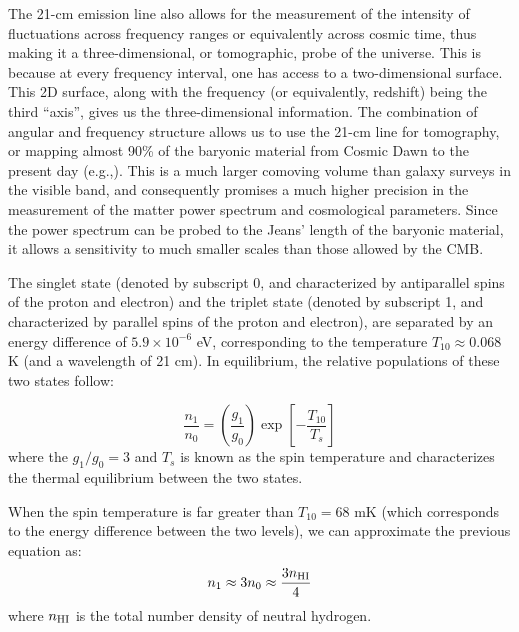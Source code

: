  The 21-cm emission line also allows for the measurement of the intensity of fluctuations across frequency ranges or equivalently across cosmic time, thus making it a three-dimensional, or tomographic, probe of the universe. This is because at every frequency interval, one has access to a two-dimensional surface. This 2D surface, along with the frequency (or equivalently, redshift) being the third ``axis'', gives us the three-dimensional information. The combination of angular and frequency structure allows us to use the 21-cm line for  tomography, or mapping almost 90\% of the baryonic material from Cosmic Dawn to the present day (e.g.,\cite{loeb2013}). This is a much larger comoving volume than galaxy surveys in the visible band, and consequently promises a much higher precision in the measurement of the matter power spectrum and cosmological parameters. Since the power spectrum can be probed to the Jeans' length of the baryonic material, it allows a sensitivity to much smaller scales than those allowed by the CMB.




The singlet state (denoted by subscript 0, and characterized by antiparallel spins of the proton and electron) and the triplet state (denoted by subscript 1, and characterized by parallel spins of the proton and electron), are separated by an energy difference of $5.9 \times 10^{-6}$ eV, corresponding to the temperature $T_{10} \approx 0.068$ K (and a wavelength of 21 cm). In equilibrium, the relative populations of these two states follow:

\begin{equation}
 \frac{n_1}{n_0} = \left(\frac{g_1}{g_0}\right) \exp\left[-\frac{T_{10}}{T_s}\right]
\end{equation} 
where the $g_1/g_0 = 3$ and $T_s$ is known as the spin temperature and characterizes the thermal equilibrium between the two states. 

 When the spin temperature is far greater than $T_{10} = 68$ mK (which corresponds to the energy difference between the two levels), we can approximate the previous equation as:
 \begin{equation}
n_1 \approx 3 n_0 \approx \frac{3 n_{\rm HI}}{4}        
\end{equation} 
where $n_{\rm HI}$ is the total number density of neutral hydrogen.


